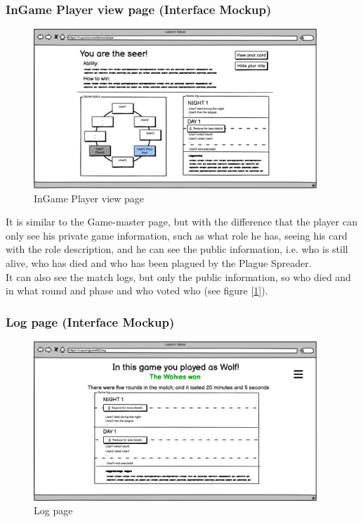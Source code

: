 \subsubsection{InGame Player view page (Interface Mockup)}
\begin{figure}[htb] 
    \centering
    \includegraphics[height=6cm]{images/Page/Game player.png}
    \caption{InGame Player view page}
    \label{fig:GamePlayer_page}
\end{figure}


It is similar to the Game-master page, but with the difference that the player can only see his private game information, such as what role he has, seeing his card with the role description, and he can see the public information, i.e. who is still alive, who has died and who has been plagued by the Plague Spreader.\\
It can also see the match logs, but only the public information, so who died and in what round and phase and who voted who (see figure [\ref{fig:GamePlayer_page}]).

\subsubsection{Log page (Interface Mockup)}
\begin{figure}[htb] 
    \centering
    \includegraphics[height=6cm]{images/Page/Log.png}
    \caption{Log page}
    \label{fig:log_page}
\end{figure}

